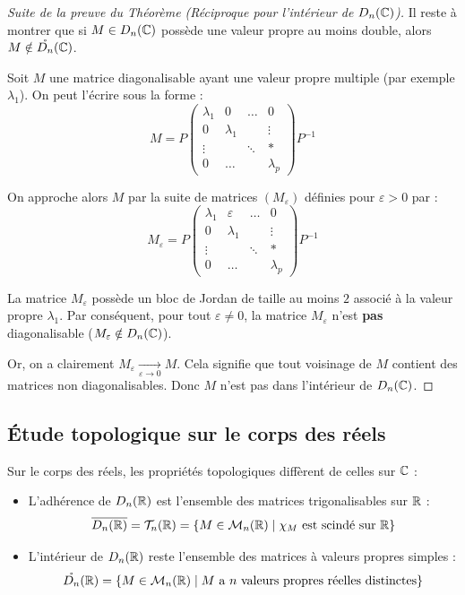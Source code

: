 \begin{proof}[Suite de la preuve du Théorème (Réciproque pour l'intérieur de $D_n(\mathbb{C})$)]
    Il reste à montrer que si $M \in D_n(\mathbb{C})$ possède une valeur propre au moins double, alors $M \notin \mathring{D_n}(\mathbb{C})$.
    
    Soit $M$ une matrice diagonalisable ayant une valeur propre multiple (par exemple $\lambda_1$). On peut l'écrire sous la forme :
    \[ M = P \begin{pmatrix} 
        \lambda_1 & 0 & \dots & 0 \\ 
        0 & \lambda_1 & & \vdots \\ 
        \vdots & & \ddots & * \\
        0 & \dots & & \lambda_p 
    \end{pmatrix} P^{-1} \]
    
    On approche alors $M$ par la suite de matrices $(M_\varepsilon)$ définies pour $\varepsilon > 0$ par :
    \[ M_\varepsilon = P \begin{pmatrix} 
        \lambda_1 & \varepsilon & \dots & 0 \\ 
        0 & \lambda_1 & & \vdots \\ 
        \vdots & & \ddots & * \\
        0 & \dots & & \lambda_p 
    \end{pmatrix} P^{-1} \]
    
    La matrice $M_\varepsilon$ possède un bloc de Jordan de taille au moins $2$ associé à la valeur propre $\lambda_1$. Par conséquent, pour tout $\varepsilon \neq 0$, la matrice $M_\varepsilon$ n'est \textbf{pas} diagonalisable ($M_\varepsilon \notin D_n(\mathbb{C})$).
    
    Or, on a clairement $M_\varepsilon \xrightarrow[\varepsilon \to 0]{} M$. Cela signifie que tout voisinage de $M$ contient des matrices non diagonalisables. 
    Donc $M$ n'est pas dans l'intérieur de $D_n(\mathbb{C})$.
\end{proof}


\subsection{Étude topologique sur le corps des réels}

\begin{theorement}{}
    Sur le corps des réels, les propriétés topologiques diffèrent de celles sur $\mathbb{C}$ :
    \begin{itemize}
        \item L'adhérence de $D_n(\mathbb{R})$ est l'ensemble des matrices trigonalisables sur $\mathbb{R}$ :
        \[ \overline{D_n(\mathbb{R})} = \mathcal{T}_n(\mathbb{R}) = \left\{ M \in \mathcal{M}_n(\mathbb{R}) \mid \chi_M \text{ est scindé sur } \mathbb{R} \right\} \]
        \item L'intérieur de $D_n(\mathbb{R})$ reste l'ensemble des matrices à valeurs propres simples :
        \[ \mathring{D_n}(\mathbb{R}) = \left\{ M \in \mathcal{M}_n(\mathbb{R}) \mid M \text{ a } n \text{ valeurs propres réelles distinctes} \right\} \]
    \end{itemize}
\end{theorement}

